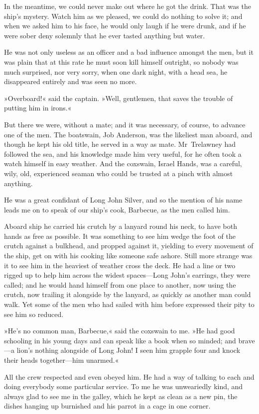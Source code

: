 In the meantime, we could never make out where he got the drink. That was the ship's mystery. Watch him as we pleased, we could do nothing to solve it; and when we asked him to his face, he would only laugh if he were drunk, and if he were sober deny solemnly that he ever tasted anything but water.

He was not only useless as an officer and a bad influence amongst the men, but it was plain that at this rate he must soon kill himself outright, so nobody was much surprised, nor very sorry, when one dark night, with a head sea, he disappeared entirely and was seen no more.

»Overboard!« said the captain. »Well, gentlemen, that saves the trouble of putting him in irons.«

But there we were, without a mate; and it was necessary, of course, to advance one of the men. The boatswain, Job Anderson, was the likeliest man aboard, and though he kept his old title, he served in a way as mate. Mr~Trelawney had followed the sea, and his knowledge made him very useful, for he often took a watch himself in easy weather. And the coxswain, Israel Hands, was a careful, wily, old, experienced seaman who could be trusted at a pinch with almost anything.

He was a great confidant of Long John Silver, and so the mention of his name leads me on to speak of our ship's cook, Barbecue, as the men called him.

Aboard ship he carried his crutch by a lanyard round his neck, to have both hands as free as possible. It was something to see him wedge the foot of the crutch against a bulkhead, and propped against it, yielding to every movement of the ship, get on with his cooking like someone safe ashore. Still more strange was it to see him in the heaviest of weather cross the deck. He had a line or two rigged up to help him across the widest spaces—Long John's earrings, they were called; and he would hand himself from one place to another, now using the crutch, now trailing it alongside by the lanyard, as quickly as another man could walk. Yet some of the men who had sailed with him before expressed their pity to see him so reduced.

»He's no common man, Barbecue,« said the coxswain to me. »He had good schooling in his young days and can speak like a book when so minded; and brave—a lion's nothing alongside of Long John! I seen him grapple four and knock their heads together—him unarmed.«

All the crew respected and even obeyed him. He had a way of talking to each and doing everybody some particular service. To me he was unweariedly kind, and always glad to see me in the galley, which he kept as clean as a new pin, the dishes hanging up burnished and his parrot in a cage in one corner.

